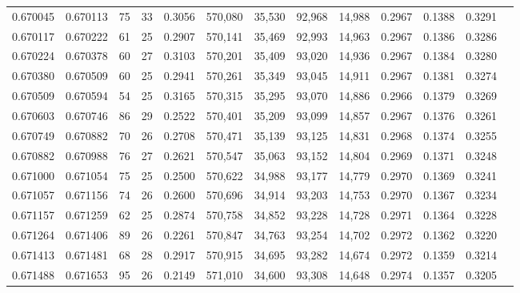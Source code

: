 \begin{tabular}{rrrrrrrrrrrrr}
0.670045 & 0.670113 &  75 &  33 &                                     0.3056 & 570,080 &  35,530 &  92,968 &  14,988 & 0.2967 & 0.1388 & 0.3291 \\
0.670117 & 0.670222 &  61 &  25 &                                     0.2907 & 570,141 &  35,469 &  92,993 &  14,963 & 0.2967 & 0.1386 & 0.3286 \\
0.670224 & 0.670378 &  60 &  27 &                                     0.3103 & 570,201 &  35,409 &  93,020 &  14,936 & 0.2967 & 0.1384 & 0.3280 \\
0.670380 & 0.670509 &  60 &  25 &                                     0.2941 & 570,261 &  35,349 &  93,045 &  14,911 & 0.2967 & 0.1381 & 0.3274 \\
0.670509 & 0.670594 &  54 &  25 &                                     0.3165 & 570,315 &  35,295 &  93,070 &  14,886 & 0.2966 & 0.1379 & 0.3269 \\
0.670603 & 0.670746 &  86 &  29 &                                     0.2522 & 570,401 &  35,209 &  93,099 &  14,857 & 0.2967 & 0.1376 & 0.3261 \\
0.670749 & 0.670882 &  70 &  26 &                                     0.2708 & 570,471 &  35,139 &  93,125 &  14,831 & 0.2968 & 0.1374 & 0.3255 \\
0.670882 & 0.670988 &  76 &  27 &                                     0.2621 & 570,547 &  35,063 &  93,152 &  14,804 & 0.2969 & 0.1371 & 0.3248 \\
0.671000 & 0.671054 &  75 &  25 &                                     0.2500 & 570,622 &  34,988 &  93,177 &  14,779 & 0.2970 & 0.1369 & 0.3241 \\
0.671057 & 0.671156 &  74 &  26 &                                     0.2600 & 570,696 &  34,914 &  93,203 &  14,753 & 0.2970 & 0.1367 & 0.3234 \\
0.671157 & 0.671259 &  62 &  25 &                                     0.2874 & 570,758 &  34,852 &  93,228 &  14,728 & 0.2971 & 0.1364 & 0.3228 \\
0.671264 & 0.671406 &  89 &  26 &                                     0.2261 & 570,847 &  34,763 &  93,254 &  14,702 & 0.2972 & 0.1362 & 0.3220 \\
0.671413 & 0.671481 &  68 &  28 &                                     0.2917 & 570,915 &  34,695 &  93,282 &  14,674 & 0.2972 & 0.1359 & 0.3214 \\
0.671488 & 0.671653 &  95 &  26 &                                     0.2149 & 571,010 &  34,600 &  93,308 &  14,648 & 0.2974 & 0.1357 & 0.3205 \\

\end{tabular}
